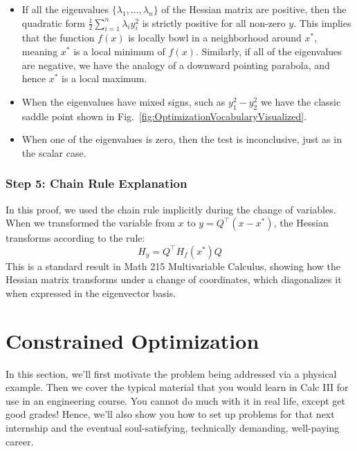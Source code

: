 \begin{itemize}
    \item If all the eigenvalues $\{\lambda_1, \ldots, \lambda_n\}$ of the Hessian matrix are positive, then the quadratic form $\frac{1}{2} \sum_{i=1}^n \lambda_i y_i^2$ is strictly positive for all non-zero $y$. This implies that the function $f(x)$ is locally bowl in a neighborhood around $x^\ast$, meaning $x^\ast$ is a local minimum of $f(x)$. Similarly, if all of the eigenvalues are negative, we have the analogy of a downward pointing parabola, and hence $x^\ast$ is a local maximum.

    \item When the eigenvalues have mixed signs, such as $y_1^2 - y_2^2$ we have the classic saddle point shown in Fig.~\ref{fig:OptimizationVocabularyVisualized}. 
    
    \item When one of the eigenvalues is zero, then the test is inconclusive, just as in the scalar case.
\end{itemize}


\subsubsection{Step 5: Chain Rule Explanation}

In this proof, we used the chain rule implicitly during the change of variables. When we transformed the variable from $x$ to $y = Q^\top (x - x^\ast)$, the Hessian transforms according to the rule:
\[
H_y = Q^\top H_f(x^\ast) Q
\]
This is a standard result in Math 215 Multivariable Calculus, showing how the Hessian matrix transforms under a change of coordinates, which diagonalizes it when expressed in the eigenvector basis.

\Qed



\section{Constrained Optimization}
\label{sec:ConstrainedOptimization}

In this section, we'll first motivate the problem being addressed via a physical example. Then we cover the typical material that you would learn in Calc III for use in an engineering course. You cannot do much with it in real life, except get good grades! Hence, we'll also show you how to set up problems for that next internship and the eventual soul-satisfying, technically demanding, well-paying career. 

